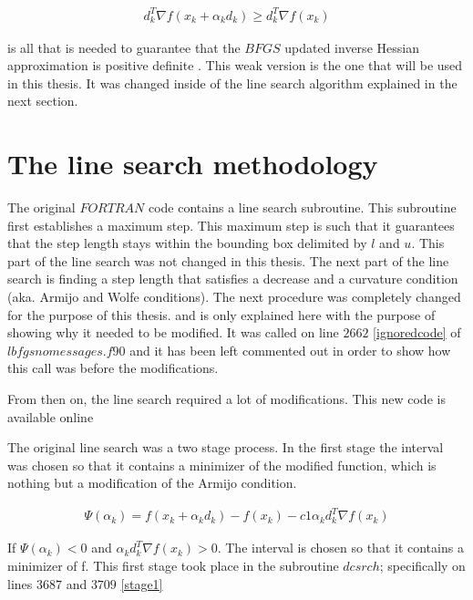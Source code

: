\begin{equation}
  \begin{aligned}
    d_k^T \nabla f(x_k + \alpha _k d_k) \geq d_k^T \nabla f(x_k)
  \end{aligned}
\end{equation}

is all that is needed to guarantee that the $BFGS$ updated inverse Hessian approximation is positive definite \citep{overtonlewis}. This weak version is the one that will be used in this thesis. It was changed inside of the line search algorithm explained in the next section.

\section{The line search methodology}

The original $FORTRAN$ code \citep{lbfgsbsoftware} contains a line search subroutine. This subroutine first establishes a maximum step. This maximum step is such that it guarantees that the step length stays within the bounding box delimited by $l$ and $u$. This part of the line search was not changed in this thesis. The next part of the line search is finding a step length that satisfies a decrease and a curvature condition (aka. Armijo and Wolfe conditions). The next procedure was completely changed for the purpose of this thesis. and is only explained here with the purpose of showing why it needed to be modified. It was called on line $2662$ \ref{ignoredcode} of $lbfgsnomessages.f90$ and it has been left commented out in order to show how this call was before the modifications.

From then on, the line search required a lot of modifications. This new code is available online \citep{lbfgsbNS}

The original line search was a two stage process. In the first stage the interval was chosen so that it contains a minimizer of the modified function, which is nothing but a modification of the Armijo condition.

\begin{equation} \label{armijomod}
  \begin{aligned}
    \Psi(\alpha_k) = f(x_k + \alpha_k d_k) - f(x_k) - c1 \alpha_k d_k^T  \nabla f(x_k)
  \end{aligned}
\end{equation} 

If $\Psi(\alpha_k) < 0$ and $\alpha_k d_k^T \nabla f(x_k) > 0$. The interval is chosen so that it contains a minimizer of f. This first stage took place in the subroutine $dcsrch$; specifically on lines $3687$ and $3709$ \ref{stage1}

